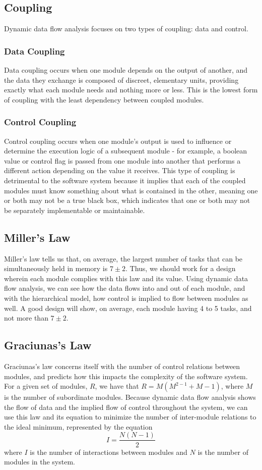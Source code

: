\documentclass{article}
\begin{document}
	\subsection{Coupling}
		Dynamic data flow analysis focuses on two types of coupling: data and control. 
		\subsubsection{Data Coupling}
		Data coupling occurs when one module depends on the output of another, and the data they exchange is composed of discreet, elementary units, providing exactly what each module needs and nothing more or less. This is the lowest form of coupling with the least dependency between coupled modules. 
		\subsubsection{Control Coupling}
		Control coupling occurs when one module's output is used to influence or determine the execution logic of a subsequent module - for example, a boolean value or control flag is passed from one module into another that performs a different action depending on the value it receives. This type of coupling is detrimental to the software system because it implies that each of the coupled modules must know something about what is contained in the other, meaning one or both may not be a true black box, which indicates that one or both may not be separately implementable or maintainable. 
	\subsection{Miller's Law}
		Miller's law tells us that, on average, the largest number of tasks that can be simultaneously held in memory is $7\pm2$. Thus, we should work for a design wherein each module complies with this law and its value. Using dynamic data flow analysis, we can see how the data flows into and out of each module, and with the hierarchical model, how control is implied to flow between modules as well. A good design will show, on average, each module having 4 to 5 tasks, and not more than $7\pm2$.  
	\subsection{Graciunas's Law}
		Graciunas's law concerns itself with the number of control relations between modules, and predicts how this impacts the complexity of the software system. For a given set of modules, $R$, we have that $R = M(M^{2-1} + M - 1)$, where $M$ is the number of subordinate modules. Because dynamic data flow analysis shows the flow of data and the implied flow of control throughout the system, we can use this law and its equation to minimize the number of inter-module relations to the ideal minimum, represented by the equation 
		$$I = \frac{N(N - 1)}{2}$$
		where $I$ is the number of interactions between modules and $N$ is the number of modules in the system. 
\end{document}
